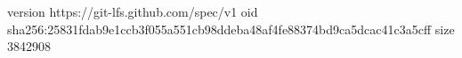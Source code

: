 version https://git-lfs.github.com/spec/v1
oid sha256:25831fdab9e1ccb3f055a551cb98ddeba48af4fe88374bd9ca5dcac41c3a5cff
size 3842908
